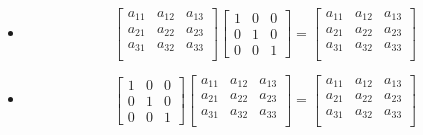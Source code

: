 \documentclass{beamer}
\theoremstyle{definition}
\theoremstyle{remark}
\begin{document}
\begin{frame}[t]
\begin{example}
\begin{itemize}
\item 
\[
\begin{bmatrix}
a_{11}&a_{12}&a_{13}\\
a_{21}&a_{22}&a_{23}\\
a_{31}&a_{32}&a_{33}\\
\end{bmatrix}\begin{bmatrix}
1&0&0\\
0&1&0\\
0&0&1
\end{bmatrix}=\begin{bmatrix}
a_{11}&a_{12}&a_{13}\\
a_{21}&a_{22}&a_{23}\\
a_{31}&a_{32}&a_{33}\\
\end{bmatrix}
\]\pause
\item 
\[
\begin{bmatrix}
1&0&0\\
0&1&0\\
0&0&1
\end{bmatrix}\begin{bmatrix}
a_{11}&a_{12}&a_{13}\\
a_{21}&a_{22}&a_{23}\\
a_{31}&a_{32}&a_{33}\\
\end{bmatrix}=\begin{bmatrix}
a_{11}&a_{12}&a_{13}\\
a_{21}&a_{22}&a_{23}\\
a_{31}&a_{32}&a_{33}\\
\end{bmatrix}
\]
\end{itemize}
\end{example}
\end{frame}
\end{document}
